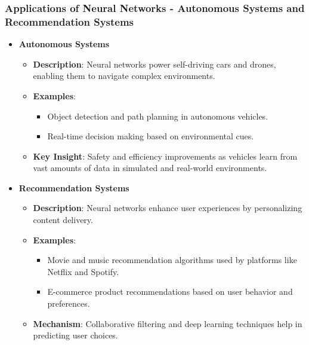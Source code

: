 \documentclass[aspectratio=169]{beamer}
\begin{document}
\begin{frame}[fragile]
    \frametitle{Applications of Neural Networks - Autonomous Systems and Recommendation Systems}
    \begin{itemize}
        \item \textbf{Autonomous Systems}
            \begin{itemize}
                \item \textbf{Description}: Neural networks power self-driving cars and drones, enabling them to navigate complex environments.
                \item \textbf{Examples}:
                    \begin{itemize}
                        \item Object detection and path planning in autonomous vehicles.
                        \item Real-time decision making based on environmental cues.
                    \end{itemize}
                \item \textbf{Key Insight}: Safety and efficiency improvements as vehicles learn from vast amounts of data in simulated and real-world environments.
            \end{itemize}

        \item \textbf{Recommendation Systems}
            \begin{itemize}
                \item \textbf{Description}: Neural networks enhance user experiences by personalizing content delivery.
                \item \textbf{Examples}:
                    \begin{itemize}
                        \item Movie and music recommendation algorithms used by platforms like Netflix and Spotify.
                        \item E-commerce product recommendations based on user behavior and preferences.
                    \end{itemize}
                \item \textbf{Mechanism}: Collaborative filtering and deep learning techniques help in predicting user choices.
            \end{itemize}
    \end{itemize}
\end{frame}
\end{document}

